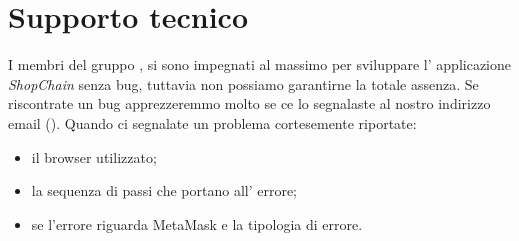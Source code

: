 \section{Supporto tecnico}\label{section:supporto_tecnico}
I membri del gruppo \groupName{}, si sono impegnati al massimo per sviluppare l' applicazione \textit{ShopChain} senza bug, tuttavia non possiamo garantirne la totale assenza.
Se riscontrate un bug apprezzeremmo molto se ce lo segnalaste al nostro indirizzo email (\groupEmail{}).
Quando ci segnalate un problema cortesemente riportate:
\begin{itemize}
    \item il browser utilizzato;
    \item la sequenza di passi che portano all' errore;
    \item se l'errore riguarda MetaMask e la tipologia di errore.
\end{itemize}
